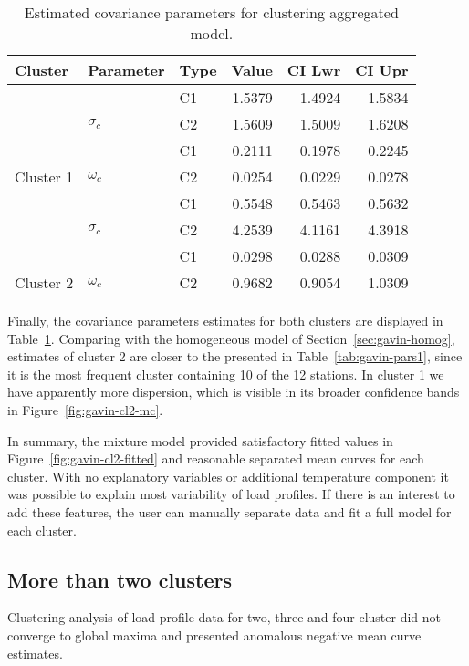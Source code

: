 \begin{table}[b]\centering
\caption{Estimated covariance parameters for clustering aggregated model.}
\begin{knitrout}
\color{fgcolor}
\begin{tabular}{lllrrr}
\toprule
Cluster & Parameter & Type & Value & CI Lwr & CI Upr\\
\midrule
 &  & C1 & 1.5379 & 1.4924 & 1.5834\\

 & \multirow{-2}{*}{\raggedright\arraybackslash $\sigma_c$} & C2 & 1.5609 & 1.5009 & 1.6208\\
\cmidrule{2-6}
 &  & C1 & 0.2111 & 0.1978 & 0.2245\\

\multirow{-4}{*}{\raggedright\arraybackslash Cluster 1} & \multirow{-2}{*}{\raggedright\arraybackslash $\omega_c$} & C2 & 0.0254 & 0.0229 & 0.0278\\
\cmidrule{1-6}
 &  & C1 & 0.5548 & 0.5463 & 0.5632\\

 & \multirow{-2}{*}{\raggedright\arraybackslash $\sigma_c$} & C2 & 4.2539 & 4.1161 & 4.3918\\
\cmidrule{2-6}
 &  & C1 & 0.0298 & 0.0288 & 0.0309\\

\multirow{-4}{*}{\raggedright\arraybackslash Cluster 2} & \multirow{-2}{*}{\raggedright\arraybackslash $\omega_c$} & C2 & 0.9682 & 0.9054 & 1.0309\\
\bottomrule
\end{tabular}


\end{knitrout}
\label{tab:gavin-pars-cl2}
\end{table}

Finally, the covariance parameters estimates for both clusters are displayed in  Table~\ref{tab:gavin-pars-cl2}. Comparing with the homogeneous model of Section~\ref{sec:gavin-homog}, estimates of cluster 2 are closer to the presented in Table~\ref{tab:gavin-pars1}, since it is the most frequent cluster containing 10 of the 12 stations. In cluster 1 we have apparently more dispersion, which is visible in its broader confidence bands in Figure~\ref{fig:gavin-cl2-mc}.


In summary, the mixture model provided satisfactory fitted values in Figure~\ref{fig:gavin-cl2-fitted} and reasonable separated mean curves for each cluster. With no explanatory variables or additional temperature component it was possible to explain most variability of load profiles. If there is an interest to add these features, the user can manually separate data and fit a full model for each cluster.



\subsection{More than two clusters}

Clustering analysis of load profile data for two, three and four cluster did not converge to global maxima and presented anomalous negative mean curve estimates. 

